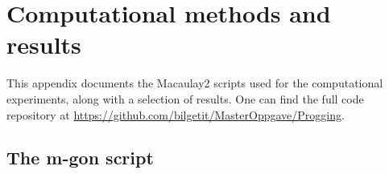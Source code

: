 \chapter{Computational methods and results}
\label{appendix}

This appendix documents the Macaulay2 scripts used for the computational experiments, along with a selection of results. One can find the full code repository at \url{https://github.com/bilgetit/MasterOppgave/Progging}.

\section{The m-gon script}
\label{app:mgon}





